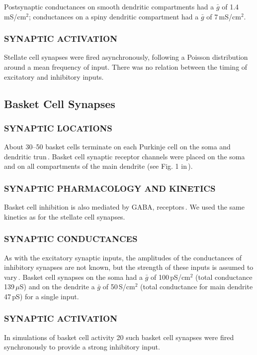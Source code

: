 \documentclass[12pt]{article}
\begin{document}
Postsynaptic conductances on smooth dendritic compartments had a $\bar g$ of 1.4\,mS/cm$^2$; conductances
on a spiny dendritic compartment had a $\bar g$ of 7\,mS/cm$^2$.

\subsubsection*{SYNAPTIC ACTIVATION}

Stellate cell synapses were fired asynchronously, following a Poisson distribution around a mean frequency of input. There was no relation between the timing of excitatory and inhibitory inputs.

\subsection*{Basket Cell Synapses}

\subsubsection*{SYNAPTIC LOCATIONS}

About 30--50 basket cells terminate on each Purkinje cell on  the soma and dendritic trun\,\cite{Palay:1974fk, Palkovits:1971vn}.  Basket cell synaptic receptor channels were placed on the soma and on all compartments of the main dendrite (see Fig. 1 in\,\cite{De-Schutter-E:1994vn}).

\subsubsection*{SYNAPTIC PHARMACOLOGY AND KINETICS} 

Basket cell inhibition is also mediated by GABA, receptors\,\cite{Gabbot:1986fk, Ito:1984uq}.  We used the same kinetics as for the stellate cell synapses.

\subsubsection*{SYNAPTIC CONDUCTANCES}

As with the excitatory synaptic inputs, the amplitudes of the conductances of inhibitory synapses are not known, but the strength of these inputs is assumed to  vary\,\cite{Bishop:1992ys}. Basket cell synapses on the soma had a $\bar g$ of 100\,pS/cm$^2$ (total conductance 139\,$\mu$S) and on the dendrite a $\bar g$ of 50\,S/cm$^2$ (total conductance for main dendrite 47\,pS) for a single input.

\subsubsection*{SYNAPTIC ACTIVATION}

In simulations of basket cell activity 20 such basket cell synapses were fired synchronously to provide a strong inhibitory input.



\end{document}
